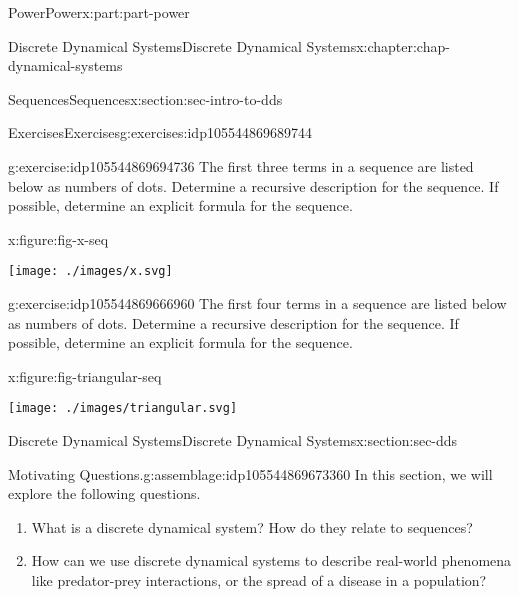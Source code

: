 \documentclass[oneside,10pt,]{book}
\numberwithin{equation}{section}
\begin{document}
\begin{partptx}{Power}{}{Power}{}{}{x:part:part-power}
\begin{chapterptx}{Discrete Dynamical Systems}{}{Discrete Dynamical Systems}{}{}{x:chapter:chap-dynamical-systems}
\begin{sectionptx}{Sequences}{}{Sequences}{}{}{x:section:sec-intro-to-dds}
\begin{exercises-subsection-numberless}{Exercises}{}{Exercises}{}{}{g:exercises:idp105544869689744}
\begin{divisionexercise}{2}{}{}{g:exercise:idp105544869694736}
The first three terms in a sequence are listed below as numbers of dots. Determine a recursive description for the sequence. If possible, determine an explicit formula for the sequence.%
\begin{figureptx}{}{x:figure:fig-x-seq}{}%
\begin{image}{0}{1}{0}%
\texttt{[image: ./images/x.svg]}
\end{image}%
\tcblower
\end{figureptx}%
\end{divisionexercise}%
\begin{divisionexercise}{3}{}{}{g:exercise:idp105544869666960}%
The first four terms in a sequence are listed below as numbers of dots. Determine a recursive description for the sequence. If possible, determine an explicit formula for the sequence.%
\begin{figureptx}{}{x:figure:fig-triangular-seq}{}%
\begin{image}{0}{1}{0}%
\texttt{[image: ./images/triangular.svg]}
\end{image}%
\tcblower
\end{figureptx}%
\end{divisionexercise}%
\end{exercises-subsection-numberless}
\end{sectionptx}
%
%
\typeout{************************************************}
\typeout{************************************************}
%
\begin{sectionptx}{Discrete Dynamical Systems}{}{Discrete Dynamical Systems}{}{}{x:section:sec-dds}
\begin{assemblage}{Motivating Questions.}{g:assemblage:idp105544869673360}%
In this section, we will explore the following questions. %
\begin{enumerate}
\item{}What is a discrete dynamical system? How do they relate to sequences?%
\item{}How can we use discrete dynamical systems to describe real-world phenomena like predator-prey interactions, or the spread of a disease in a population?%
\end{enumerate}
%
\end{assemblage}
\begin{introduction}{}%

\end{introduction}
\end{sectionptx}
\end{chapterptx}
\end{partptx}
\end{document}
